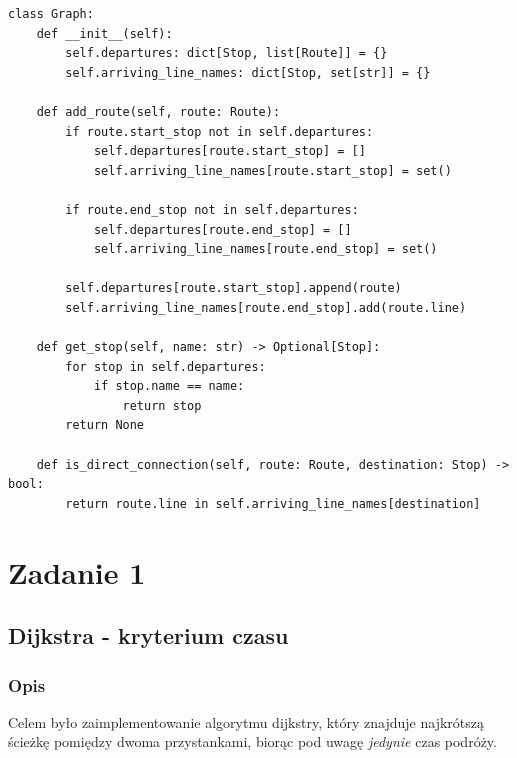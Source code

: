 \documentclass[a4paper, 12pt]{article}
\begin{document}
\begin{itemize}
\begin{lstlisting}
class Graph:
    def __init__(self):
        self.departures: dict[Stop, list[Route]] = {}
        self.arriving_line_names: dict[Stop, set[str]] = {}

    def add_route(self, route: Route):
        if route.start_stop not in self.departures:
            self.departures[route.start_stop] = []
            self.arriving_line_names[route.start_stop] = set()

        if route.end_stop not in self.departures:
            self.departures[route.end_stop] = []
            self.arriving_line_names[route.end_stop] = set()

        self.departures[route.start_stop].append(route)
        self.arriving_line_names[route.end_stop].add(route.line)

    def get_stop(self, name: str) -> Optional[Stop]:
        for stop in self.departures:
            if stop.name == name:
                return stop
        return None

    def is_direct_connection(self, route: Route, destination: Stop) -> bool:
        return route.line in self.arriving_line_names[destination]
\end{lstlisting}


    \end{itemize}



\section{Zadanie 1}
  \subsection{Dijkstra - kryterium czasu}
  \subsubsection{Opis} Celem było zaimplementowanie algorytmu dijkstry, który
  znajduje najkrótszą ścieżkę pomiędzy dwoma przystankami, biorąc pod uwagę \textit{jedynie}
  czas podróży. 
\end{document}
